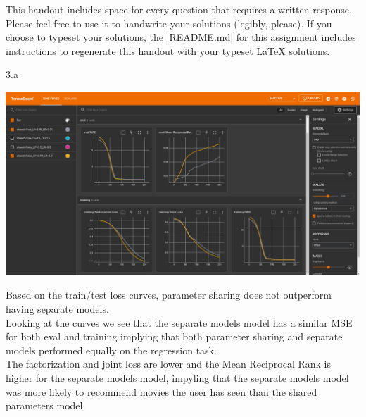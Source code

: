 

\def\assignmentnum{1 }
\def\assignmenttitle{XCS330 Problem Set \assignmentnum}


\pagestyle{myheadings} \markboth{}{\assignmenttitle}


This handout includes space for every question that requires a written response.
Please feel free to use it to handwrite your solutions (legibly, please).  If
you choose to typeset your solutions, the |README.md| for this assignment includes
instructions to regenerate this handout with your typeset \LaTeX{} solutions.

\LARGE
3.a
\normalsize
\begin{answer}
	\begin{center}
		\includegraphics[width=1.0\textwidth]{LF99LR01}
	\end{center}
	Based on the train/test loss curves, parameter sharing does not outperform having separate models. \\
	Looking at the curves we see that the separate models model has a similar MSE for both eval and training implying that both parameter sharing and separate models performed equally on the regression task. \\
	The factorization and joint loss are lower and the Mean Reciprocal Rank is higher for the separate models model, impyling that the separate models model was more likely to recommend movies the user has seen than the shared parameters model.
\end{answer}


